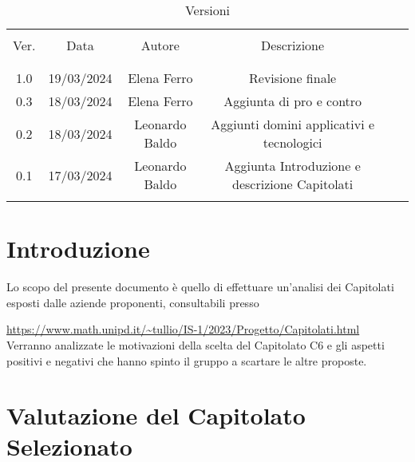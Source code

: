 \documentclass[italian,12pt]{article} %
\begin{document}


\newpage



\begin{table}[!h]
	\caption{Versioni}
	\begin{center}
		\begin{tabular}{ c c c c c c }
			\hline                                                                              \\[-2ex]
			Ver. & Data       & Autore         & Descrizione                                    \\
			\\[-2ex] \hline \\[-1.5ex]
			1.0  & 19/03/2024 & Elena Ferro    & Revisione finale                               \\
			0.3  & 18/03/2024 & Elena Ferro    & Aggiunta di pro e contro                       \\
			0.2  & 18/03/2024 & Leonardo Baldo & Aggiunti domini applicativi e tecnologici      \\
			0.1  & 17/03/2024 & Leonardo Baldo & Aggiunta Introduzione e descrizione Capitolati \\
			\\[-1.5ex] \hline
		\end{tabular}
	\end{center}
\end{table}

\newpage

\tableofcontents

\newpage

\section{Introduzione}
Lo scopo del presente documento è quello di effettuare un'analisi dei Capitolati esposti
dalle aziende proponenti, consultabili presso

\url{https://www.math.unipd.it/~tullio/IS-1/2023/Progetto/Capitolati.html}\\
Verranno analizzate le motivazioni della scelta del Capitolato C6
e gli aspetti positivi e negativi che hanno spinto il gruppo a scartare le altre proposte.

\section{Valutazione del Capitolato Selezionato}
\end{document}
